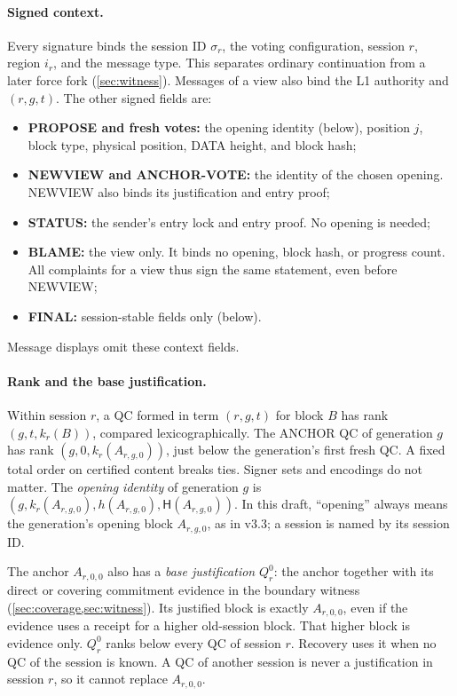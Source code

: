 \documentclass[11pt,a4paper]{article}
\newif\ifrevmarks
\newcommand{\Rv}[1]{\ifrevmarks\leavevmode{\color{rvBlue}#1}\else#1\fi}
\newcommand{\Cid}[1]{\ifrevmarks\textsuperscript{\hyperlink{chg:#1}{\color{rvBlue}\sffamily\scriptsize#1}}\fi}
\newcommand{\Hash}{\mathsf H}
\begin{document}
\paragraph{Signed context.}
Every signature binds the \Rv{session ID $\sigma_r$}, the
voting configuration, session $r$, region $i_r$, and the message type.
This separates ordinary continuation from a later force fork
(\cref{sec:witness}). Messages of a view also bind the L1
authority and $(r,g,t)$. The other signed fields are:
\begin{itemize}
\item \textbf{PROPOSE and fresh votes:} the \Rv{opening identity
(below)}, position $j$, block
type, physical position, DATA height, and block hash;
\item \textbf{NEWVIEW and ANCHOR-VOTE:} the identity of the chosen
opening. NEWVIEW also binds its justification and entry proof;
\item \textbf{STATUS:} the sender's entry lock and entry proof. No
opening is needed;
\item \textbf{BLAME:} the view only. It binds no opening, block hash, or
progress count. All complaints for a view thus sign the same statement,
even before NEWVIEW;
\item \textbf{FINAL:} session-stable fields only (below).
\end{itemize}
Message displays omit these context fields.

\paragraph{Rank and the base justification.}
Within session $r$, a QC formed in term $(r,g,t)$ for block $B$ has rank
$(g,t,k_r(B))$, compared lexicographically. The ANCHOR QC of generation
$g$ has rank $(g,0,k_r(A_{r,g,0}))$, just below the generation's first
fresh QC. A fixed total order on certified content breaks ties. Signer
sets and encodings do not matter. \Rv{The \emph{opening
identity} of generation $g$ is}
$(g,k_r(A_{r,g,0}),h(A_{r,g,0}),\Hash(A_{r,g,0}))$. \Rv{In this draft,
``opening'' always means the generation's opening block $A_{r,g,0}$, as
in v3.3; a session is named by its session ID.}

The anchor $A_{r,0,0}$ also has a \emph{base justification} $Q_r^0$: the
anchor together with its direct or covering commitment evidence in the
boundary witness (\cref{sec:coverage,sec:witness}). Its justified block
is exactly $A_{r,0,0}$, even if the evidence uses a receipt for a higher
old-session block. That higher block is evidence only. $Q_r^0$ ranks
below every QC of session $r$.
Recovery uses it when no QC of the session is known. A QC of another
session is never a justification in session $r$, so it cannot replace
$A_{r,0,0}$.
\end{document}
